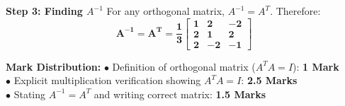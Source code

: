 \begin{solutionbox}
\textbf{Step 3: Finding $A^{-1}$}
For any orthogonal matrix, $A^{-1} = A^T$. Therefore:
\[
\mathbf{A^{-1} = A^T = \frac{1}{3}\begin{bmatrix} 1 & 2 & -2 \\ 2 & 1 & 2 \\ 2 & -2 & -1 \end{bmatrix}}
\]

\begin{markingrubric}
\textbf{Mark Distribution:}
$\bullet$ Definition of orthogonal matrix ($A^T A = I$): \textbf{1 Mark}\\
$\bullet$ Explicit multiplication verification showing $A^T A = I$: \textbf{2.5 Marks}\\
$\bullet$ Stating $A^{-1} = A^T$ and writing correct matrix: \textbf{1.5 Marks}
\end{markingrubric}
\end{solutionbox}

